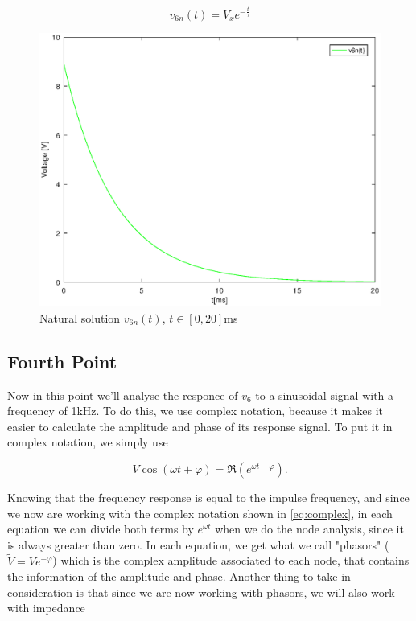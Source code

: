 \begin{equation}
  v_{6n}(t) = V_x e^{-\frac{t}{\tau}}
  \label{eq:snat}
\end{equation}

\begin{figure}[h!] \centering
\includegraphics[width=0.7\linewidth]{naturalsolution.eps}
\caption{Natural solution $v_{6n}(t)$, $t\in[0,20]$ms}
\label{fig:snat}
\end{figure}

\newpage
\subsection{Fourth Point}
\label{ssec:4T}

\par Now in this point we'll analyse the responce of $v_6$ to a sinusoidal signal with a frequency of 1kHz. To do this, we use complex notation, because it makes it easier to calculate the amplitude and phase of its response signal. To put it in complex notation, we simply use 

\begin{equation}
  V\cos(\omega t + \varphi) = \Re (e^{\omega t - \varphi}).
  \label{eq:complex}
\end{equation}

\par Knowing that the frequency response is equal to the impulse frequency, and since we now are working with the complex notation shown in \ref{eq:complex}, in each equation we can divide both terms by $e^{\omega t}$ when we do the node analysis, since it is always greater than zero. In each equation, we get what we call "phasors" ($\widetilde{V}=V e^{-\varphi}$) which is the complex amplitude associated to each node, that contains the information of the amplitude and phase. Another thing to take in consideration is that since we are now working  with phasors, we will also work with impedance

